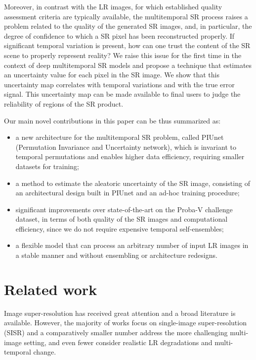 \documentclass[journal]{IEEEtran}
\begin{document}
Moreover, in contrast with the LR images, for which established quality assessment criteria are typically available, the multitemporal SR process raises a problem related to the quality of the generated SR images, and, in particular, the degree of confidence to which a SR pixel has been reconstructed properly. If significant temporal variation is present, how can one trust the content of the SR scene to properly represent reality? We raise this issue for the first time in the context of deep multitemporal SR models and propose a technique that estimates an uncertainty value for each pixel in the SR image. We show that this uncertainty map correlates with temporal variations and with the true error signal. This uncertainty map can be made available to final users to judge the reliability of regions of the SR product.  

Our main novel contributions in this paper can be thus summarized as:
\begin{itemize}
    \item a new architecture for the multitemporal SR problem, called PIUnet (Permutation Invariance and Uncertainty network), which is invariant to temporal permutations and enables higher data efficiency, requiring smaller datasets for training;
    \item a method to estimate the aleatoric uncertainty of the SR image, consisting of an architectural design built in PIUnet and an ad-hoc training procedure;
    \item significant improvements over state-of-the-art on the Proba-V challenge dataset, in terms of both quality of the SR images and computational efficiency, since we do not require expensive temporal self-ensembles;
    \item a flexible model that can process an arbitrary number of input LR images in a stable manner and without ensembling or architecture redesigns.
\end{itemize}




\section{Related work}
\label{sec:relatedWork}

Image super-resolution has received great attention and a broad literature is available. However, the majority of works focus on single-image super-resolution (SISR) and a comparatively smaller number address the more challenging multi-image setting, and even fewer consider realistic LR degradations and multi-temporal change. 
\end{document}
